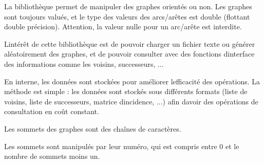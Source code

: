 La bibliothèque permet de manipuler des graphes orientés ou non. Les graphes sont toujours valués, et le type des valeurs des arcs/arêtes est double (flottant double précision). Attention, la valeur nulle pour un arc/arête est interdite.

L\textquotesingle{}intérêt de cette bibliothèque est de pouvoir charger un fichier texte ou générer aléatoirement des graphes, et de pouvoir consulter avec des fonctions d\textquotesingle{}interface des informations comme les voisins, successeurs, ...

En interne, les données sont stockées pour améliorer l\textquotesingle{}efficacité des opérations. La méthode est simple \+: les données sont stockés sous différents formats (liste de voisins, liste de successeurs, matrice d\textquotesingle{}incidence, ...) afin d\textquotesingle{}avoir des opérations de consultation en coût constant.

Les sommets des graphes sont des chaînes de caractères.

Les sommets sont manipulés par leur numéro, qui est compris entre 0 et le nombre de sommets moins un. 
